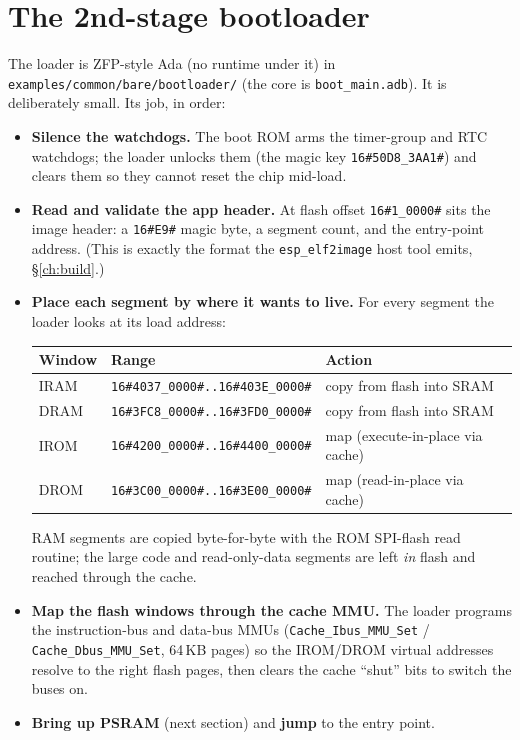 \section{The 2nd-stage bootloader}

The loader is ZFP-style Ada (no runtime under it) in
\texttt{examples/common/bare/bootloader/} (the core is \texttt{boot\_main.adb}).
It is deliberately small. Its job, in order:

\begin{itemize}
\item \textbf{Silence the watchdogs.} The boot ROM arms the timer-group and RTC
  watchdogs; the loader unlocks them (the magic key \texttt{16\#50D8\_3AA1\#}) and
  clears them so they cannot reset the chip mid-load.
\item \textbf{Read and validate the app header.} At flash offset
  \texttt{16\#1\_0000\#} sits the image header: a \texttt{16\#E9\#} magic byte, a segment
  count, and the entry-point address. (This is exactly the format the
  \texttt{esp\_elf2image} host tool emits, \S\ref{ch:build}.)
\item \textbf{Place each segment by where it wants to live.} For every segment
  the loader looks at its load address:
\begin{center}
\begin{tabular}{l l l}
\toprule
\textbf{Window} & \textbf{Range} & \textbf{Action} \\ \midrule
IRAM   & \texttt{16\#4037\_0000\#..16\#403E\_0000\#} & copy from flash into SRAM \\
DRAM   & \texttt{16\#3FC8\_0000\#..16\#3FD0\_0000\#} & copy from flash into SRAM \\
IROM   & \texttt{16\#4200\_0000\#..16\#4400\_0000\#} & map (execute-in-place via cache) \\
DROM   & \texttt{16\#3C00\_0000\#..16\#3E00\_0000\#} & map (read-in-place via cache) \\
\bottomrule
\end{tabular}
\end{center}
  RAM segments are copied byte-for-byte with the ROM SPI-flash read routine; the
  large code and read-only-data segments are left \emph{in} flash and reached
  through the cache.
\item \textbf{Map the flash windows through the cache MMU.} The loader programs
  the instruction-bus and data-bus MMUs (\texttt{Cache\_Ibus\_MMU\_Set} /
  \texttt{Cache\_Dbus\_MMU\_Set}, 64\,KB pages) so the IROM/DROM virtual
  addresses resolve to the right flash pages, then clears the cache ``shut'' bits
  to switch the buses on.
\item \textbf{Bring up PSRAM} (next section) and \textbf{jump} to the entry point.
\end{itemize}

